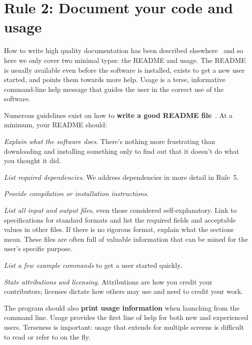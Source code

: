 \documentclass[10pt,letterpaper]{article}
\newcommand{\rulemajor}[1]{\section{#1}}
\newcommand{\ruleminor}[1]{\textbf{#1}}
\newcommand{\reviewed}[1]{{\color{black}#1}}
\begin{document}
\reviewed{\rulemajor{Rule 2: Document your code and usage}

How to write high quality documentation has been described elsewhere~\cite{karimzadeh2016}
and so here we only cover two minimal types: the README and usage.
The README is usually available even before the software is installed,
exists
to get a new user started, and points them towards more
help. Usage is a terse, informative command-line help message that
guides the user in the correct use of the software.

Numerous guidelines exist on how to \ruleminor{write a good
README file}~\cite{Johnson1997,gnustandards}.
At a minimum, your README should:

\begin{enumerate}

\item \textit{Explain what the software does}.
There's nothing more frustrating
than downloading and installing something only to
find out that it doesn't do what you thought it did.

\item \textit{List required dependencies}.
We address dependencies in more detail in Rule~5.

\item \textit{Provide compilation or installation instructions}.

\item \textit{List all input and output files},
even those considered self-explanatory.
Link to specifications for standard formats
and list the required fields and acceptable values in other files.
If there is no rigorous format, explain what the sections mean.
These files are often full of valuable information that can be
mined for the user's specific purpose.

\reviewed{\item \textit{List a few example commands} to get a user started quickly.}

\item \textit{State attributions and licensing}. Attributions are how you credit
your contributors; licenses dictate how others may use and
need to credit your work.
\end{enumerate}

The program should also
\ruleminor{print usage information} when launching from the command line.
Usage provides the first line of help for both new and experienced users.
Terseness is important: usage that extends for multiple screens is
difficult to read or refer to on the fly.

}
\end{document}
